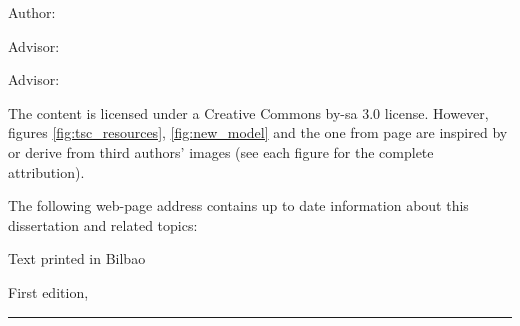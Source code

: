 
\thispagestyle{empty}

\hfill

\vfill

\medskip


\noindent
\textit{
\Title
}




Author: \Author

Advisor: \Advisor

Advisor: \Advisortwo


\vfill


\noindent
The content is licensed under a Creative Commons by-sa 3.0 license.
However, figures \ref{fig:tsc_resources}, \ref{fig:new_model} and the one from page \pageref{fig:shouldersOfGiants} are inspired by or derive from third authors' images
(see each figure for the complete attribution).

\vfill

\noindent
The following web-page address contains up to date information about this dissertation and related topics: \\
\website


\noindent
Text printed in Bilbao

\noindent
First edition, 
\monthname \ \the\year

\vspace{1cm}
\hrule
\bigskip

\cleardoublepage

%
%
%
%
%
%


